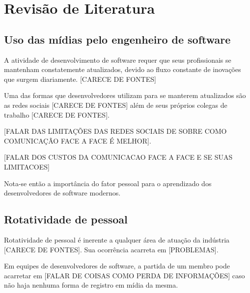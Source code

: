 \chapter{Revisão de Literatura}

\section{Uso das mídias pelo engenheiro de software}

A atividade de desenvolvimento de software requer que seus profissionais se mantenham constatemente atualizados, devido ao fluxo constante de inovações que surgem diariamente. [CARECE DE FONTES]

Uma das formas que desenvolvedores utilizam para se manterem atualizados são as redes sociais [CARECE DE FONTES] além de seus próprios colegas de trabalho [CARECE DE FONTES]. %

[FALAR DAS LIMITAÇÕES DAS REDES SOCIAIS DE SOBRE COMO COMUNICAÇÃO FACE A FACE É MELHOR].

[FALAR DOS CUSTOS DA COMUNICACAO FACE A FACE E SE SUAS LIMITACOES]

Nota-se então a importância do fator pessoal para o aprendizado dos desenvolvedores de software modernos.

\section{Rotatividade de pessoal}

Rotatividade de pessoal é inerente a qualquer área de atuação da indústria [CARECE DE FONTES].
Sua ocorrência acarreta em [PROBLEMAS].

Em equipes de desenvolvedores de software, a partida de um membro pode acarretar em [FALAR DE COISAS COMO PERDA DE INFORMAÇÕES] caso não haja nenhuma forma de registro em mídia da mesma.

